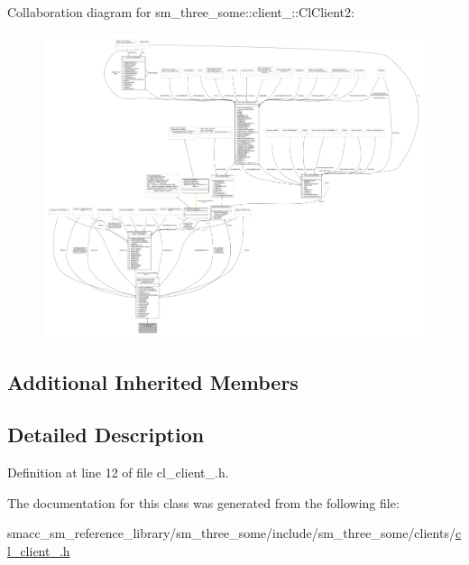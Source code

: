 Collaboration diagram for sm\+\_\+three\+\_\+some\+:\+:client\+\_\+:\+:Cl\+Client2\+:
\nopagebreak
\begin{figure}[H]
\begin{center}
\leavevmode
\includegraphics[width=350pt]{classsm__three__some_1_1client__2_1_1ClClient2__coll__graph}
\end{center}
\end{figure}
\subsection*{Additional Inherited Members}


\subsection{Detailed Description}


Definition at line 12 of file cl\+\_\+client\+\_.\+h.



The documentation for this class was generated from the following file\+:\begin{DoxyCompactItemize}
\item 
smacc\+\_\+sm\+\_\+reference\+\_\+library/sm\+\_\+three\+\_\+some/include/sm\+\_\+three\+\_\+some/clients/\hyperlink{cl__client__2_8h}{cl\+\_\+client\+\_.\+h}\end{DoxyCompactItemize}
